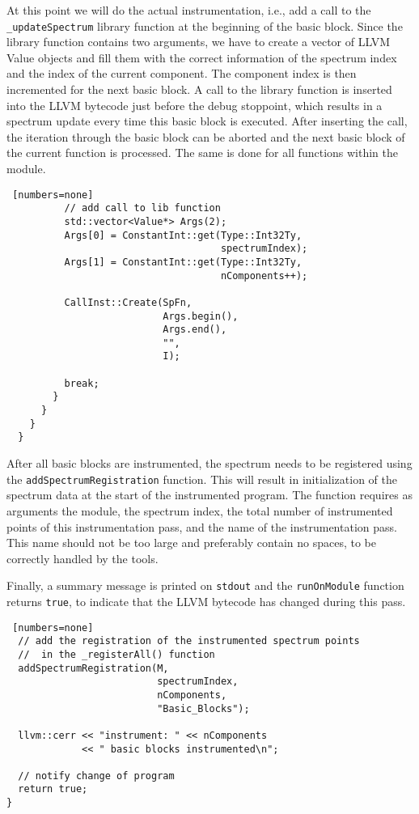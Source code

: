 At this point we will do the actual instrumentation,
i.e., add a call to the \texttt{\_updateSpectrum} library function
at the beginning of the basic block.
Since the library function contains two arguments, 
we have to create a vector of LLVM Value objects and
fill them with the correct information of the spectrum index and
the index of the current component.
The component index is then incremented for the next basic block.
A call to the library function is inserted into the LLVM bytecode
just before the debug stoppoint,
which results in a spectrum update every time this basic block
is executed.
After inserting the call, the iteration through the basic block
can be aborted and the next basic block of the current function
is processed.
The same is done for all functions within the module.

\begin{lstlisting} [numbers=none]
          // add call to lib function
          std::vector<Value*> Args(2);
          Args[0] = ConstantInt::get(Type::Int32Ty, 
                                     spectrumIndex);
          Args[1] = ConstantInt::get(Type::Int32Ty, 
                                     nComponents++);
          
          CallInst::Create(SpFn, 
                           Args.begin(),  
                           Args.end(), 
                           "", 
                           I);

          break;
        }
      }
    }
  }
\end{lstlisting}

After all basic blocks are instrumented,
the spectrum needs to be registered using the
\verb|addSpectrumRegistration| function.
This will result in initialization of the spectrum data at 
the start of the instrumented program.
The function requires as arguments the module, the spectrum index, 
the total number of instrumented points of this instrumentation pass,
and the name of the instrumentation pass.
This name should not be too large and preferably contain no spaces,
to be correctly handled by the tools.

Finally, a summary message is printed on \texttt{stdout} and
the \texttt{runOnModule} function returns \texttt{true}, 
to indicate that the LLVM bytecode has changed during this pass.

\begin{lstlisting} [numbers=none]
  // add the registration of the instrumented spectrum points 
  //  in the _registerAll() function
  addSpectrumRegistration(M, 
                          spectrumIndex, 
                          nComponents, 
                          "Basic_Blocks");
  
  llvm::cerr << "instrument: " << nComponents 
             << " basic blocks instrumented\n";

  // notify change of program 
  return true;
}
\end{lstlisting}

